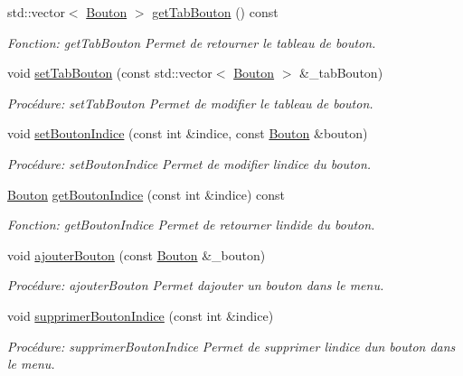 \begin{DoxyCompactItemize}
std\+::vector$<$ \hyperlink{classBouton}{Bouton} $>$ \hyperlink{classMenu_a5614b2f97741d2d71177f40b49151bc8}{get\+Tab\+Bouton} () const
\begin{DoxyCompactList}\small\item\em Fonction\+: get\+Tab\+Bouton Permet de retourner le tableau de bouton. \end{DoxyCompactList}\item 
void \hyperlink{classMenu_a45b3fe1a4d7cca82acabd3102d8bfd7c}{set\+Tab\+Bouton} (const std\+::vector$<$ \hyperlink{classBouton}{Bouton} $>$ \&\+\_\+tab\+Bouton)
\begin{DoxyCompactList}\small\item\em Procédure\+: set\+Tab\+Bouton Permet de modifier le tableau de bouton. \end{DoxyCompactList}\item 
void \hyperlink{classMenu_a33304f235efdcaa1f500f944f23e8762}{set\+Bouton\+Indice} (const int \&indice, const \hyperlink{classBouton}{Bouton} \&bouton)
\begin{DoxyCompactList}\small\item\em Procédure\+: set\+Bouton\+Indice Permet de modifier l\textquotesingle{}indice du bouton\textquotesingle{}. \end{DoxyCompactList}\item 
\hyperlink{classBouton}{Bouton} \hyperlink{classMenu_a892dd884c5e7675f8cfd9c59c3247f96}{get\+Bouton\+Indice} (const int \&indice) const
\begin{DoxyCompactList}\small\item\em Fonction\+: get\+Bouton\+Indice Permet de retourner l\textquotesingle{}indide du bouton. \end{DoxyCompactList}\item 
void \hyperlink{classMenu_a6f14df82f9e51a4fe61fefef62e31062}{ajouter\+Bouton} (const \hyperlink{classBouton}{Bouton} \&\+\_\+bouton)
\begin{DoxyCompactList}\small\item\em Procédure\+: ajouter\+Bouton Permet d\textquotesingle{}ajouter un bouton dans le menu. \end{DoxyCompactList}\item 
void \hyperlink{classMenu_a1ed5172963be698f6fbabcf5a87ff664}{supprimer\+Bouton\+Indice} (const int \&indice)
\begin{DoxyCompactList}\small\item\em Procédure\+: supprimer\+Bouton\+Indice Permet de supprimer l\textquotesingle{}indice d\textquotesingle{}un bouton dans le menu. \end{DoxyCompactList}\item 

\end{DoxyCompactItemize}
